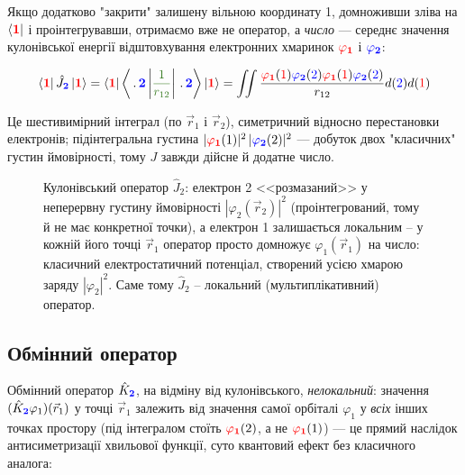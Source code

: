 \documentclass[]{article}
\def\ket#1{\left| #1 \right\rangle }
\def\bra#1{\left\langle #1 \right| }
\def\opbracket#1#2#3{\left\langle #1\left| \textcolor{OliveGreen}{#2}\right|  #3 \right\rangle}
\def\vr{\vec{r}}
\let\vphi\varphi
\def\f{(\textcolor{red}{1})}
\def\s{(\textcolor{blue}{2})}
\def\F{\textcolor{red}{\mathbf{1}}}
\def\S{\textcolor{blue}{\mathbf{2}}}
\def\oa{\textcolor{red}{ \vphi_{\mathbf{1}}} }
\def\ob{\textcolor{blue}{ \vphi_{\mathbf{2}}} }
\def\V{\frac{1}{r_{12}}}
\def\dt{\,.\,}
\begin{document}
Якщо додатково "закрити" залишену вільною координату 1, домноживши зліва на $\bra{\F}$ і проінтегрувавши, отримаємо вже не оператор, а \emph{число} --- середнє значення кулонівської енергії відштовхування електронних хмаринок $\oa$ і $\ob$:

\begin{equation*}
   \bra{\F}\hat{J}_{\S}\ket{\F} = \bra{\F}\opbracket{\dt\S}{\V}{\dt\S} \ket{\F} = \iint \frac{\oa\f\ob\s\oa\f\ob\s}{r_{12}} d\s d\f
\end{equation*}

Це шестивимірний інтеграл (по $\vr_1$ і $\vr_2$), симетричний відносно перестановки електронів; підінтегральна густина $|\oa(1)|^2\,|\ob(2)|^2$ --- добуток двох "класичних" густин ймовірності, тому $J$ завжди дійсне й додатне число.

\begin{figure}[h!]
\centering
{}
\caption{Кулонівський оператор $\hat J_2$: електрон 2 <<розмазаний>> у неперервну густину ймовірності $|\varphi_2(\vec r_2)|^2$ (проінтегрований, тому й не має конкретної точки), а електрон 1 залишається локальним -- у кожній його точці $\vec r_1$ оператор просто домножує $\varphi_1(\vec r_1)$ на число: класичний електростатичний потенціал, створений усією хмарою заряду $|\varphi_2|^2$. Саме тому $\hat J_2$ -- локальний (мультиплікативний) оператор.}
\label{fig:coulomb-operator}
\end{figure}

\subsection*{Обмінний оператор}

Обмінний оператор $\hat{K}_{\S}$, на відміну від кулонівського, \emph{нелокальний}: значення $(\hat{K}_{\S}\vphi_1)(\vr_1)$ у точці $\vr_1$ залежить від значення самої орбіталі $\vphi_1$ у \emph{всіх} інших точках простору (під інтегралом стоїть $\oa(2)$, а не $\oa(1)$) --- це прямий наслідок антисиметризації хвильової функції, суто квантовий ефект без класичного аналога:
\end{document}

